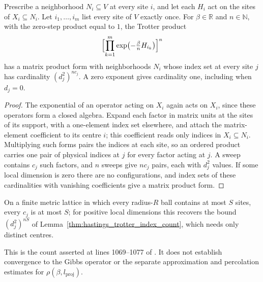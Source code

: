 \begin{lemma}
    \label{lem:hastings_active_index_product_form}
    \leanok
    Prescribe a neighborhood $N_i\subseteq V$ at every site $i$, and let each
    $H_i$ act on the sites of $X_i\subseteq N_i$. Let $i_1,\dots,i_m$ list
    every site of $V$ exactly once. For $\beta\in\mathbb R$ and
    $n\in\mathbb N$, with the zero-step product equal to $1$, the Trotter
    product
    \begin{align*}
        \Bigl[\prod_{k=1}^m\exp\bigl(-\tfrac\beta nH_{i_k}\bigr)\Bigr]^n
    \end{align*}
    has a matrix product form with neighborhoods $N_i$ whose index set at
    every site $j$ has cardinality $(d_j^2)^{nc_j}$. A zero exponent gives
    cardinality one, including when $d_j=0$.
\end{lemma}
\begin{proof}\leanok
    The exponential of an operator acting on $X_i$ again acts on $X_i$,
    since these operators form a closed algebra. Expand each factor in
    matrix units at the sites of its support, with a one-element index set
    elsewhere, and attach the matrix-element coefficient to its centre
    $i$; this coefficient reads only indices in $X_i\subseteq N_i$.
    Multiplying such forms pairs the indices at each site, so an ordered
    product carries one pair of physical indices at $j$ for every factor
    acting at $j$. A sweep contains $c_j$ such factors, and $n$ sweeps give
    $nc_j$ pairs, each with $d_j^2$ values. If some local dimension is
    zero there are no configurations, and index sets of these cardinalities
    with vanishing coefficients give a matrix product form.
\end{proof}

On a finite metric lattice in which every radius-$R$ ball contains at
most $S$ sites, every $c_j$ is at most $S$; for positive local dimensions
this recovers the bound $(d_j^2)^{nS}$ of
Lemma~\ref{thm:hastings_trotter_index_count}, which needs only distinct
centres.

This is the count asserted at lines 1069--1077 of
\cite{Hastings2006Solving}. It does not establish convergence to the Gibbs
operator or the separate approximation and percolation estimates for
$\rho(\beta,l_{\mathrm{proj}})$.
